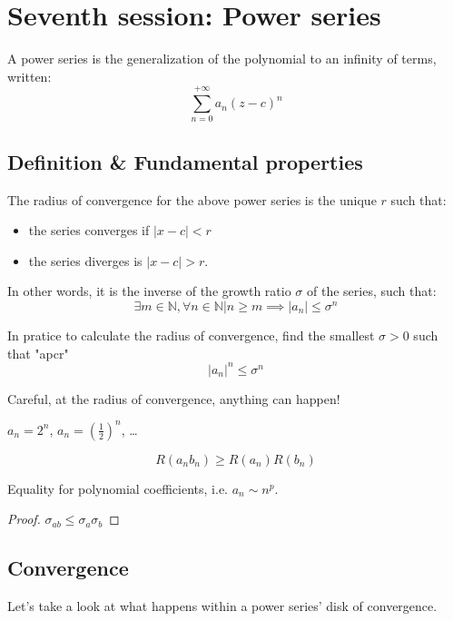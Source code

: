 \section{Seventh session: Power series}

A power series is the generalization of the polynomial to an infinity of terms, written:
$$\sum_{n=0}^{+\infty}a_n(z-c)^n$$

\subsection{Definition \& Fundamental properties}

\begin{defi}
    The radius of convergence for the above power series is the unique $r$ such that:
    \begin{itemize}
        \item the series converges if $|x - c| < r$ 
        \item the series diverges is $|x - c| > r$.
    \end{itemize}

    In other words, it is the inverse of the growth ratio $\sigma$ of the series, such that:
    $$\exists m \in \mathbb{N}, \forall n \in \mathbb{N} \vert n \geq m \implies |a_n| \leq \sigma^n $$
\end{defi}

In pratice to calculate the radius of convergence, find the smallest $\sigma > 0$ such that "apcr" $$|a_n|^n \leq \sigma^n$$

\begin{note}
    Careful, at the radius of convergence, anything can happen!
\end{note}

\begin{example}
    [$\star$]
    $a_n = 2^n$, $a_n = \left(\frac{1}{2}\right)^n$, \dots
\end{example}

\begin{thm*}
    $$R(a_nb_n) \geq R(a_n)R(b_n)$$

    Equality for polynomial coefficients, i.e. $a_n \sim n^p$.
\end{thm*}
\begin{proof}
    $\sigma_{ab} \leq \sigma_a\sigma_b$
\end{proof}

\subsection{Convergence}
Let's take a look at what happens within a power series' disk of convergence.

